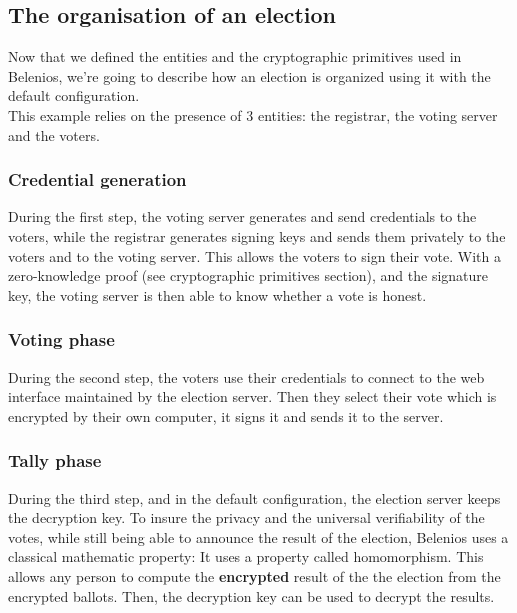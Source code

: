 \documentclass[12pt, a4paper]{report}
\begin{document}
\subsection{The organisation of an election}

Now that we defined the entities and the cryptographic primitives used in Belenios, we're going to describe how an election is organized using it with the default configuration.\\

This example relies on the presence of 3 entities: the registrar, the voting server and the voters. \cite{BOOK:1}

\subsubsection{Credential generation}

During the first step, the voting server generates and send credentials to the voters, while the registrar generates signing keys and sends them privately to the voters and to the voting server. \cite{BOOK:1} \cite{WEBSITE:1} This allows the voters to sign their vote. With a zero-knowledge proof (see cryptographic primitives section), and the signature key, the voting server is then able to know whether a  vote is honest.  

\subsubsection{Voting phase}

During the second step, the voters use their credentials to connect to the web interface maintained by the election server. Then they select their vote which is encrypted by their own computer, it signs it and sends it to the server. \cite{BOOK:1} \cite{BOOK:2} 

\subsubsection{Tally phase}

During the third step, and in the default configuration, the election server keeps the decryption key. To insure the privacy and the universal verifiability of the votes, while still being able to announce the result of the election, Belenios uses a classical mathematic property: It uses a property called homomorphism. This allows any person to compute the \textbf{encrypted} result of the the election from the encrypted ballots. Then, the decryption key can be used to decrypt the results.\cite{BOOK:1}
 
\end{document}
